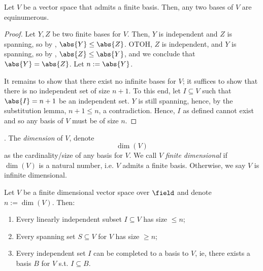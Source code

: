 \begin{corollary}
    Let $V$ be a vector space that admits a finite basis. Then, any two bases of $V$ are equinumerous.
\end{corollary}

\begin{proof}
    Let $Y, Z$ be two finite bases for $V$. Then, $Y$ is independent and $Z$ is spanning, so by , $\abs{Y} \leq \abs{Z}$. OTOH, $Z$ is independent, and $Y$ is spanning, so by , $\abs{Z} \leq \abs{Y}$, and we conclude that $\abs{Y} = \abs{Z}$. Let $n := \abs{Y}$.

    It remains to show that there exist no infinite bases for $V$; it suffices to show that there is no independent set of size $n+1$. To this end, let $I \subseteq V$ such that $\abs{I} = n+1$ be an independent set. $Y$ is still spanning, hence, by the substitution lemma, $n + 1 \leq n$, a contradiction. Hence, $I$ as defined cannot exist and so any basis of $V$ must be of size $n$.
\end{proof}

\begin{definition}[Dimension]
     . The \emph{dimension} of $V$, denote $$\dim (V)$$ as the cardinality/size of any basis for $V$. We call $V$ \emph{finite dimensional} if $\dim (V)$ is a natural number, i.e. $V$ admits a finite basis. Otherwise, we say $V$ is infinite dimensional.
\end{definition}

\begin{corollary}\label{cor:corofstein}
    Let $V$ be a finite dimensional vector space over $\field$ and denote $n := \dim (V)$. Then: 
    \begin{enumerate}
        \item Every linearly independent subset $I \subseteq V$ has size $\leq n$;
        \item Every spanning set $S \subseteq V$ for $V$ has size $\geq n$;
        \item Every independent set $I$ can be completed to a basis to $V$, ie, there exists a basis $B$ for $V$ s.t. $I \subseteq B$.
    \end{enumerate}
\end{corollary}

